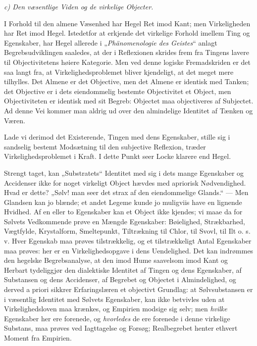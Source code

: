 \documentclass[12pt]{book}
\newcommand{\opage}[1]{\marginnote{\footnotesize\textit{[#1]}}}
\begin{document}
\emph{c) Den væsentlige Viden og de virkelige Objecter.}

I Forhold til den almene Væsenhed har Hegel Ret imod Kant; men Virkeligheden har Ret
imod Hegel. Istedetfor at erkjende det virkelige Forhold imellem Ting og Egenskaber,
har Hegel allerede i „\textit{Phänomenologie des Geistes}“ anlagt Begrebsudviklingen
saaledes, at der i Reflexionen skrides frem fra Tingens lavere til Objectivitetens
høiere Kategorie. Men ved denne logiske Fremadskriden er det saa langt fra, at
Virkelighedsproblemet bliver kjendeligt, at det meget mere tilhylles. Det Almene er det
Objective, men det Almene er identisk med Tanken; det Objective er i dets eiendommelig
bestemte Objectivitet et Object, men Objectiviteten er identisk med sit Begreb: Objectet
maa objectiveres af Subjectet. Ad denne Vei kommer man aldrig ud over den almindelige
Identitet af Tænken og Væren.

Lade vi derimod det Existerende, Tingen med dens Egenskaber, stille sig i sandselig
bestemt Modsætning til den subjective Reflexion, træder Virkelighedsproblemet i Kraft.
I dette Punkt seer Locke klarere end Hegel.

Strengt taget, kan „Substratets“ Identitet med sig i dets mange Egenskaber og
Accidenser ikke for noget virkeligt Object hævdes med apriorisk Nødvendighed. Hvad er
dette? „Sølv! man seer det strax af den eiendommelige Glands.“ — Men Glandsen kan jo
blænde; et andet Legeme kunde jo muligviis have en lignende Hvidhed. Af en eller to
Egenskaber kan et Object ikke kjendes; vi maae da for Sølvets Vedkommende prøve en
Mængde Egenskaber: Bøielighed, Strækbarhed, Vægtfylde, Krystalform, Smeltepunkt,
Tiltrækning til Chlor, til Svovl, til Ilt o. s. v. Hver Egenskab maa prøves
tilstrækkelig, og et tilstrækkeligt Antal Egenskaber maa prøves: her er en
Virkelighedsopgave i dens Uendelighed.
\opage{67} Det kan indrømmes den hegelske Begrebsanalyse, at den imod Hume saavelsom imod Kant og
Herbart tydeliggjør den dialektiske Identitet af Tingen og dens Egenskaber, af
Substansen og dens Accidenser, af Begrebet og Objectet i Almindelighed, og derved a
priori sikkrer Erfaringslæren et objectivt Grundlag: at Sølvsubstansen er i væsentlig
Identitet med Sølvets Egenskaber, kan ikke betvivles uden at Virkelighedsloven maa
krænkes, og Empirien modsige sig selv; men \emph{hvilke} Egenskaber her ere forenede,
og \emph{hvorledes} de ere forenede i denne virkelige Substans, maa prøves ved
Iagttagelse og Forsøg; Realbegrebet henter ethvert Moment fra Empirien.
\end{document}
